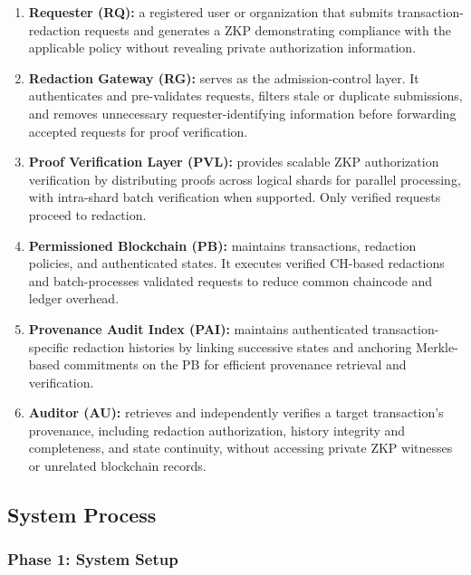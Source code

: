 \documentclass[lettersize,journal]{IEEEtran}
\begin{document}
\begin{enumerate}

\item \textbf{Requester (RQ):} a registered user or organization that submits transaction-redaction requests and generates a ZKP demonstrating compliance with the applicable policy without revealing private authorization information.

\item \textbf{Redaction Gateway (RG):} serves as the admission-control layer. It authenticates and pre-validates requests, filters stale or duplicate submissions, and removes unnecessary requester-identifying information before forwarding accepted requests for proof verification.

\item \textbf{Proof Verification Layer (PVL):} provides scalable ZKP authorization verification by distributing proofs across logical shards for parallel processing, with intra-shard batch verification when supported. Only verified requests proceed to redaction.

\item \textbf{Permissioned Blockchain (PB):} maintains transactions, redaction policies, and authenticated states. It executes verified CH-based redactions and batch-processes validated requests to reduce common chaincode and ledger overhead.

\item \textbf{Provenance Audit Index (PAI):} maintains authenticated transaction-specific redaction histories by linking successive states and anchoring Merkle-based commitments on the PB for efficient provenance retrieval and verification.

\item \textbf{Auditor (AU):} retrieves and independently verifies a target transaction's provenance, including redaction authorization, history integrity and completeness, and state continuity, without accessing private ZKP witnesses or unrelated blockchain records.

\end{enumerate}


\subsection{System Process}

\medskip
\subsubsection*{\textbf{Phase 1: System Setup}}
\label{sec:phase1}
\end{document}
